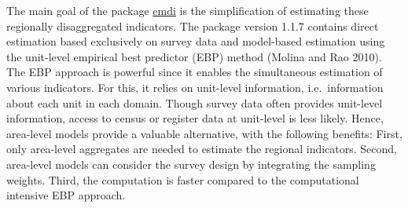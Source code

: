 The main goal of the package
\href{https://CRAN.R-project.org/package=emdi}{emdi} is the simplification of
estimating these regionally disaggregated indicators. The package
version 1.1.7 contains direct estimation based exclusively on survey
data and model-based estimation using the unit-level empirical best
predictor (EBP) method (Molina and Rao 2010). The EBP approach is powerful since
it enables the simultaneous estimation of various indicators. For this,
it relies on unit-level information, i.e.~information about each unit in
each domain. Though survey data often provides unit-level information,
access to census or register data at unit-level is less likely. Hence,
area-level models provide a valuable alternative, with the following
benefits: First, only area-level aggregates are needed to estimate the
regional indicators. Second, area-level models can consider the survey
design by integrating the sampling weights. Third, the computation is
faster compared to the computational intensive EBP approach.


